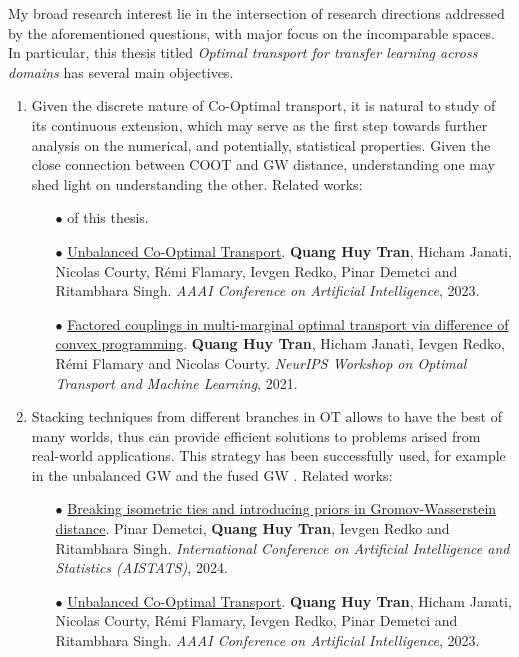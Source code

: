 My broad research interest lie in the intersection of research directions addressed
by the aforementioned questions, with major focus on the incomparable spaces.
In particular, this thesis titled
\textit{Optimal transport for transfer learning across domains} has several main objectives.
\begin{enumerate}
    \item Given the discrete nature of Co-Optimal transport, it is natural to study of its continuous extension,
    which may serve as the first step towards further analysis on the numerical,
    and potentially, statistical properties. Given the close connection between
    COOT and GW distance,
    understanding one may shed light on understanding the other. Related works:
    \begin{itemize}
        \item[$\bullet$]  of this thesis.

        \item[$\bullet$] \ul{Unbalanced Co-Optimal Transport}. \textbf{Quang Huy Tran},
        Hicham Janati, Nicolas Courty, Rémi Flamary, Ievgen Redko, Pinar Demetci and Ritambhara Singh.
        \textit{AAAI Conference on Artificial Intelligence}, 2023.

        \item[$\bullet$] \ul{Factored couplings in multi-marginal optimal transport via difference of
        convex programming}. \textbf{Quang Huy Tran}, Hicham Janati, Ievgen Redko,
        Rémi Flamary and Nicolas Courty.
        \textit{NeurIPS Workshop on Optimal Transport and Machine Learning}, 2021.
    \end{itemize}

    \item Stacking techniques from different branches in OT allows to have the best of many worlds,
    thus can provide efficient solutions to problems arised from real-world applications.
    This strategy has been successfully used,
    for example in the unbalanced GW \citep{Sejourne20} and the fused GW \citep{Vayer19b}. Related works:
    \begin{itemize}
        \item[$\bullet$] \ul{Breaking isometric ties and introducing priors in Gromov-Wasserstein distance}.
        Pinar Demetci, \textbf{Quang Huy Tran}, Ievgen Redko and Ritambhara Singh.
        \textit{International Conference on Artificial Intelligence and Statistics (AISTATS)}, 2024.

        \item[$\bullet$] \ul{Unbalanced Co-Optimal Transport}. \textbf{Quang Huy Tran}, Hicham Janati,
        Nicolas Courty, Rémi Flamary, Ievgen Redko, Pinar Demetci and Ritambhara Singh.
        \textit{AAAI Conference on Artificial Intelligence}, 2023.


\end{itemize}
\end{enumerate}
